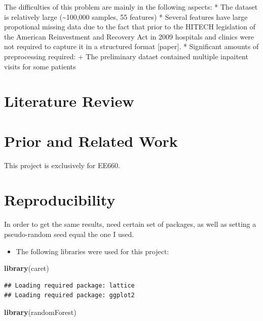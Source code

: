 \documentclass[]{article}
\newenvironment{Shaded}{\begin{snugshade}}{\end{snugshade}}
\newcommand{\KeywordTok}[1]{\textcolor[rgb]{0.13,0.29,0.53}{\textbf{{#1}}}}
\newcommand{\NormalTok}[1]{{#1}}
\begin{document}
The difficulties of this problem are mainly in the following aspects: *
The dataset is relatively large (\textasciitilde{}100,000 samples, 55
features) * Several features have large propotional missing data due to
the fact that prior to the HITECH legislation of the American
Reinvestment and Recovery Act in 2009 hospitals and clinics were not
required to capture it in a structured format {[}paper{]}. * Significant
amounts of preprocessing required: + The preliminary dataet contained
multiple inpaitent visits for some patients

\section{Literature Review}\label{literature-review}

\section{Prior and Related Work}\label{prior-and-related-work}

This project is exclusively for EE660.

\section{Reproducibility}\label{reproducibility}

In order to get the same results, need certain set of packages, as well
as setting a pseudo-random seed equal the one I used.

\begin{itemize}
\itemsep1pt\parskip0pt
\item
  The following libraries were used for this project:
\end{itemize}

\begin{Shaded}
\begin{Highlighting}[]
\KeywordTok{library}\NormalTok{(caret)}
\end{Highlighting}
\end{Shaded}

\begin{verbatim}
## Loading required package: lattice
## Loading required package: ggplot2
\end{verbatim}

\begin{Shaded}
\begin{Highlighting}[]
\KeywordTok{library}\NormalTok{(randomForest)}
\end{Highlighting}
\end{Shaded}
\end{document}
